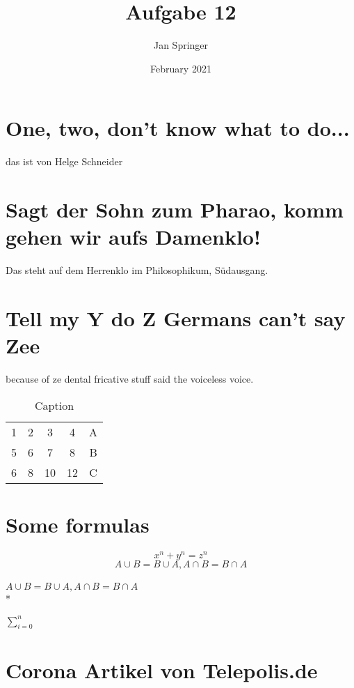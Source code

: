 \documentclass{scrartcl}
\title{Aufgabe 12}
\author{Jan Springer}
\date{February 2021}
\begin{document}
\maketitle
\tableofcontents
\section{One, two, don't know what to do...}
das ist von Helge Schneider

\section{Sagt der Sohn zum Pharao, komm gehen wir aufs Damenklo!}
Das steht auf dem Herrenklo im Philosophikum, Südausgang.

\section{Tell my Y do Z Germans can't say Zee}
because of ze dental fricative stuff said the voiceless voice.

\begin{table}[]
    \centering
    \begin{tabular}{cccc|c}
    \hline
        1 & 2 & 3 & 4 & A \\
        5 & 6 & 7 & 8 & B \\ \hline
        6 & 8 & 10 & 12& C \\
    \end{tabular}
    \caption{Caption}
    \label{tab:my_label}
\end{table}

\section{ Some formulas }
\[ x^n + y^n = z^n \] 
\newline
\[ A \cup B = B \cup A, A \cap B = B \cap A \] %
\\
$ A \cup B = B \cup A, A \cap B = B \cap A $
\\*

 $\sum\limits_{i=0}^{n}$ %

\section{Corona Artikel von Telepolis.de}
\end{document}
